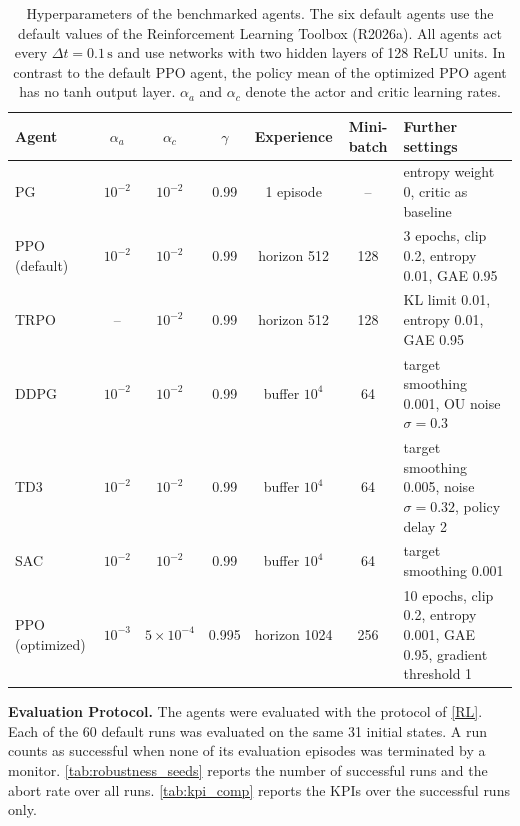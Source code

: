 \documentclass{ieeeaccess}
\begin{document}
\begin{table}[!t]
\centering
\caption{Hyperparameters of the benchmarked agents. The six default agents use the default values of the
Reinforcement Learning Toolbox (R2026a). All agents act every $\Delta t = 0.1\,\mathrm{s}$ and use
networks with two hidden layers of 128 ReLU units. In contrast to the default PPO agent, the policy mean
of the optimized PPO agent has no tanh output layer. $\alpha_a$ and $\alpha_c$ denote the actor and
critic learning rates.}
\label{tab:hyperparameters}
\begin{tabular}{lcccccl}
\toprule
\textbf{Agent} & $\alpha_a$ & $\alpha_c$ & $\gamma$ & \textbf{Experience} & \textbf{Mini-batch} & \textbf{Further settings} \\
\midrule
PG & $10^{-2}$ & $10^{-2}$ & 0.99 & 1 episode & -- & entropy weight 0, critic as baseline \\
PPO (default) & $10^{-2}$ & $10^{-2}$ & 0.99 & horizon 512 & 128 & 3 epochs, clip 0.2, entropy 0.01, GAE 0.95 \\
TRPO & -- & $10^{-2}$ & 0.99 & horizon 512 & 128 & KL limit 0.01, entropy 0.01, GAE 0.95 \\
DDPG & $10^{-2}$ & $10^{-2}$ & 0.99 & buffer $10^4$ & 64 & target smoothing 0.001, OU noise $\sigma = 0.3$ \\
TD3 & $10^{-2}$ & $10^{-2}$ & 0.99 & buffer $10^4$ & 64 & target smoothing 0.005, noise $\sigma = 0.32$, policy delay 2 \\
SAC & $10^{-2}$ & $10^{-2}$ & 0.99 & buffer $10^4$ & 64 & target smoothing 0.001 \\
\midrule
PPO (optimized) & $10^{-3}$ & $5\!\times\!10^{-4}$ & 0.995 & horizon 1024 & 256 & 10 epochs, clip 0.2, entropy 0.001, GAE 0.95, gradient threshold 1 \\
\bottomrule
\end{tabular}
\end{table}


\textbf{Evaluation Protocol.} The agents were evaluated with the protocol of \cref{RL}. Each of the 60
default runs was evaluated on the same 31 initial states. A run counts as successful when none of its
evaluation episodes was terminated by a monitor. \cref{tab:robustness_seeds} reports the number of
successful runs and the abort rate over all runs. \cref{tab:kpi_comp} reports the KPIs over the
successful runs only.
\end{document}
